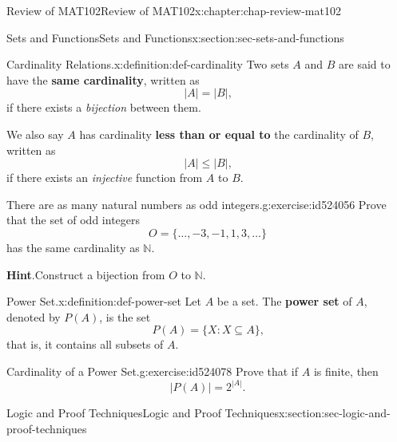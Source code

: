 \documentclass[oneside,10pt,]{book}
\newcommand{\blocktitlefont}{\relax}
\newcommand{\terminology}[1]{\textbf{#1}}
\numberwithin{equation}{section}
\begin{document}
\begin{chapterptx}{Review of MAT102}{}{Review of MAT102}{}{}{x:chapter:chap-review-mat102}
\begin{sectionptx}{Sets and Functions}{}{Sets and Functions}{}{}{x:section:sec-sets-and-functions}
\begin{definition}{Cardinality Relations.}{x:definition:def-cardinality}%
\label{g:notation:id523954}\label{g:notation:id523982} Two sets \(A\) and \(B\) are said to have the \terminology{same cardinality}, written as%
\begin{equation*}
|A| = |B|\text{,}
\end{equation*}
if there exists a \emph{bijection} between them.%
\par
We also say \(A\) has cardinality \terminology{less than or equal to} the cardinality of \(B\), written as%
\begin{equation*}
|A| \leq |B|\text{,}
\end{equation*}
if there exists an \emph{injective} function from \(A\) to \(B\).%
\end{definition}
\begin{inlineexercise}{There are as many natural numbers as odd integers.}{g:exercise:id524056}%
Prove that the set of odd integers%
\begin{equation*}
O = \{\ldots,-3,-1,1,3,\ldots\}
\end{equation*}
has the same cardinality as \(\mathbb{N}\).%
\par\smallskip%
\noindent\textbf{\blocktitlefont Hint}.\hypertarget{g:hint:id524031}{}\quad{}Construct a bijection from \(O\) to \(\mathbb{N}\).%
\end{inlineexercise}%
\begin{definition}{Power Set.}{x:definition:def-power-set}%
\label{g:notation:id524060} Let \(A\) be a set. The \terminology{power set} of \(A\), denoted by \(P(A)\), is the set%
\begin{equation*}
P(A) = \{X : X \subseteq A\}\text{,}
\end{equation*}
that is, it contains all subsets of \(A\).%
\end{definition}
\begin{inlineexercise}{Cardinality of a Power Set.}{g:exercise:id524078}%
Prove that if \(A\) is finite, then%
\begin{equation*}
|P(A)| = 2^{|A|}\text{.}
\end{equation*}
%
\end{inlineexercise}%
\end{sectionptx}
%
%
\typeout{************************************************}
\typeout{************************************************}
%
\begin{sectionptx}{Logic and Proof Techniques}{}{Logic and Proof Techniques}{}{}{x:section:sec-logic-and-proof-techniques}

\end{sectionptx}
\end{chapterptx}
\end{document}
